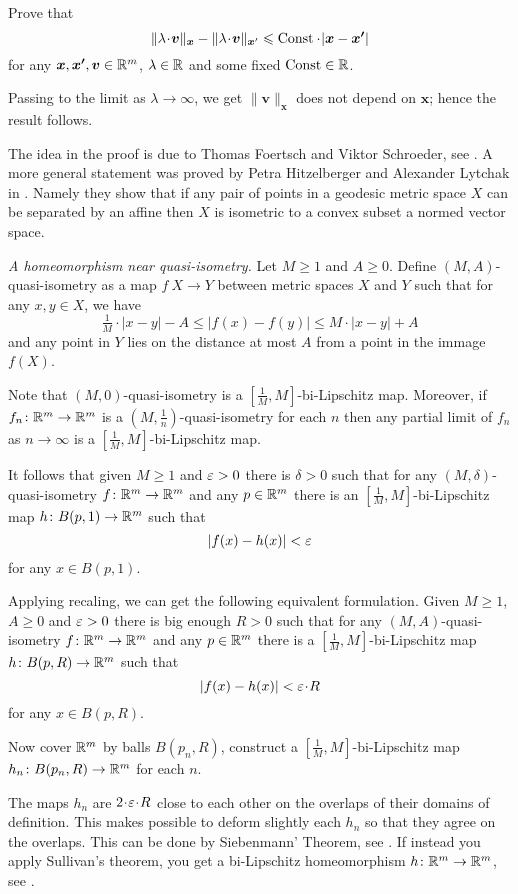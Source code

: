 Prove that 
\[
\|\lambda\cdot\bm{v}\|_{\bm{x}}
-
\|\lambda\cdot\bm{v}\|_{\bm{x}'}
\le 
\Const\cdot |\bm{x}-\bm{x'}|\]
for any $\bm{x},\bm{x'},\bm{v}\in\mathbb{R}^m$, 
$\lambda\in\mathbb{R}$
and some fixed $\operatorname{\rm Const}\in\mathbb{R}$.

Passing to the limit as $\lambda\to\infty$, 
we get
$\|\bm{v}\|_{\bm{x}}$ does not depend on $\bm{x}$;
hence the result follows.

The idea in the proof is due to Thomas Foertsch
and Viktor Schroeder, see \cite{foertsch-schroeder}.
A more general statement was proved by Petra Hitzelberger and Alexander Lytchak in \cite{hitzelberger-lytchak}.
Namely they show that if any pair of points in a geodesic metric space $X$ can be separated by an affine then $X$ is isometric to a convex subset a normed vector space.


\textit{A homeomorphism near quasi-isometry.}
Let $M\ge 1$ and $A\ge 0$.
Define $(M,A)$-quasi-isometry
as a map $f\:X\to Y$ between metric spaces $X$ and $Y$ such that for any $x,y\in X$,
 we have
\[\tfrac1M\cdot |x-y|-A\le |f(x)-f(y)|\le M\cdot |x-y|+A\]
and any point in $Y$ lies on the distance at most $A$ from a point in the immage $f(X)$.

Note that $(M,0)$-quasi-isometry is a $[\tfrac1M,M]$-bi-Lipschitz map.
Moreover,
if $f_n\colon\mathbb{R}^m\to\mathbb{R}^m$ is a  $(M,\frac1n)$-quasi-isometry 
for each $n$ then any partial limit of $f_n$ as $n\to\infty$
is a $[\tfrac1M,M]$-bi-Lipschitz map.

It follows that given $M\ge 1$ and $\varepsilon>0$ there is $\delta>0$ such that 
for any $(M,\delta)$-quasi-isometry $f\colon\mathbb{R}^m\to\mathbb{R}^m$ and any $p\in \mathbb{R}^m$
there is an $[\tfrac1M,M]$-bi-Lipschitz map $h\colon B(p,1)\to \mathbb{R}^m$
such that
\[|f(x)-h(x)|<\varepsilon\]
for any $x\in B(p,1)$.

Applying recaling, we can get the following equivalent formulation. 
Given $M\ge 1$, $A\ge 0$ and $\varepsilon>0$
there is big enough $R>0$ such that for any $(M,A)$-quasi-isometry 
$f\colon\mathbb{R}^m\to\mathbb{R}^m$ and any $p\in\mathbb{R}^m$ there is a $[\tfrac1M,M]$-bi-Lipschitz map $h\colon B(p,R)\to \mathbb{R}^m$
such that 
\[|f(x)-h(x)|<\eps\cdot R\]
for any $x\in B(p,R)$.

Now cover $\mathbb{R}^m$ by balls
$B(p_n,R)$, construct a $[\tfrac1M,M]$-bi-Lipschitz map $h_n\colon B(p_n,R)\to \mathbb{R}^m$ for each $n$.

The maps $h_n$ are $2\cdot \eps\cdot R$ close to each other on the overlaps of their domains of definition.
This makes possible to deform slightly each $h_n$ so that they agree on the overlaps.
This can be done by Siebenmann' Theorem, see \cite{siebenmann}.
If instead you apply Sullivan's theorem, you get a bi-Lipschitz homeomorphism $h\colon\mathbb{R}^m\to\mathbb{R}^m$,
see \cite{sullivan}.


